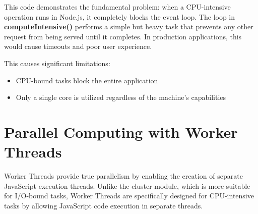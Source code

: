 \documentclass[12pt,letterpaper]{article}
\begin{document}
This code demonstrates the fundamental problem: when a CPU-intensive operation runs in Node.js, it completely blocks the event loop. The loop in \textbf{\textcolor{accentColor}{computeIntensive()}} performs a simple but heavy task that prevents any other request from being served until it completes. In production applications, this would cause timeouts and poor user experience.

This causes significant limitations:
\begin{itemize}
    \item CPU-bound tasks block the entire application
    \item Only a single core is utilized regardless of the machine's capabilities
\end{itemize}

\section{Parallel Computing with Worker Threads}

Worker Threads provide true parallelism by enabling the creation of separate JavaScript execution threads. Unlike the cluster module, which is more suitable for I/O-bound tasks, Worker Threads are specifically designed for CPU-intensive tasks by allowing JavaScript code execution in separate threads.
\end{document}
